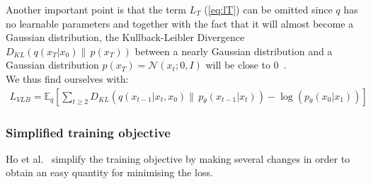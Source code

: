 \documentclass[twoside]{article}
\numberwithin{equation}{section}
\numberwithin{figure}{section}
\begin{document}
Another important point is that the term $L_T$ (\ref{eq:lT}) can be omitted since $q$ has no learnable parameters and together with the fact that it will almost become a Gaussian distribution, the Kullback-Leibler Divergence $D_{KL}\left(q\left(x_T | x_0\right) \| \, p\left(x_T\right)\right)$ between a nearly Gaussian distribution and a Gaussian distribution $p\left(x_T\right) = \mathcal{N}\left(x_t; 0, I\right)$ will be close to 0~\cite{ho2020denoising}. \\
We thus find ourselves with:
\begin{gather}
  L_{VLB} = \mathbb{E}_q \left[ \sum_{t \geq 2} D_{KL}\left(q\left(x_{t-1} | x_t, x_0\right) \| \, p_{\theta}\left(x_{t-1} | x_t\right)\right) - \log\left(p_{\theta}\left(x_0 | x_1\right)\right) \right]
\end{gather}

\subsubsection{Simplified training objective}

Ho et al.~\cite{ho2020denoising} simplify the training objective by making several changes in order to obtain an easy quantity for minimising the loss. 
\end{document}
